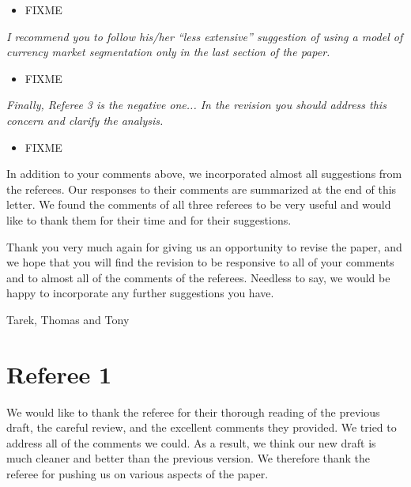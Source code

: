 \begin{itemize}
\item FIXME
\end{itemize}

\textit{I recommend you to follow his/her ``less extensive''
  suggestion of using a model of currency market segmentation only in
  the last section of the paper.}

\begin{itemize}
\item FIXME
\end{itemize}

\textit{Finally, Referee 3 is the negative one... In the revision you
  should address this concern and clarify the analysis.}

\begin{itemize}
\item FIXME
\end{itemize}

In addition to your comments above, we incorporated almost all
suggestions from the referees. Our responses to their comments are
summarized at the end of this letter. We found the comments of all
three referees to be very useful and would like to thank them for
their time and for their suggestions.

Thank you very much again for giving us an opportunity to revise the
paper, and we hope that you will find the revision to be responsive to
all of your comments and to almost all of the comments of the
referees. Needless to say, we would be happy to incorporate any
further suggestions you have.


\bigskip

\noindent Tarek, Thomas and Tony


\newpage

\setcounter{page}{1}



\section*{Referee 1}
\noindent We would like to thank the referee for their thorough
reading of the previous draft, the careful review, and the excellent
comments they provided. We tried to address all of the comments we
could. As a result, we think our new draft is much cleaner and better
than the previous version. We therefore thank the referee for pushing
us on various aspects of the paper.


